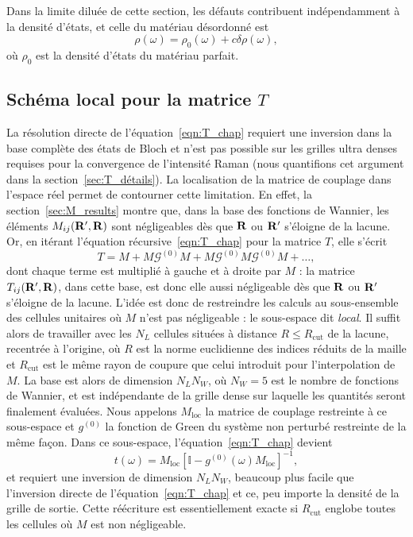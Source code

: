Dans la limite diluée de cette section, les défauts contribuent indépendamment à la densité d'états, et celle du matériau désordonné est
\begin{equation}
    \rho(\omega) = \rho_0(\omega) + c\delta\rho(\omega),
\end{equation}
où $\rho_0$ est la densité d'états du matériau parfait.

\subsection{Schéma local pour la matrice $T$}\label{sec:T_local}

La résolution directe de l'équation~\eqref{eqn:T_chap} requiert une inversion dans la base complète des états de Bloch et n'est pas possible sur les grilles ultra denses requises pour la convergence de l'intensité Raman (nous quantifions cet argument dans la section~\ref{sec:T_détails}). La localisation de la matrice de couplage dans l'espace réel permet de contourner cette limitation. En effet, la section~\ref{sec:M_results} montre que, dans la base des fonctions de Wannier, les éléments $M_{ij}(\mathbf{R}',\mathbf{R})$ sont négligeables dès que $\mathbf{R}$ ou $\mathbf{R}'$ s'éloigne de la lacune. Or, en itérant l'équation récursive~\eqref{eqn:T_chap} pour la matrice $T$, elle s'écrit
\begin{equation}
    T = M+ M\mathcal{G}^{(0)}M+M\mathcal{G}^{(0)}M\mathcal{G}^{(0)}M+\dots,
\end{equation}
dont chaque terme est multiplié à gauche et à droite par $M$ : la matrice $T_{ij}(\mathbf{R}',\mathbf{R})$, dans cette base, est donc elle aussi négligeable dès que $\mathbf{R}$ ou $\mathbf{R}'$ s'éloigne de la lacune. L'idée est donc de restreindre les calculs au sous-ensemble des cellules unitaires où $M$ n'est pas négligeable : le sous-espace dit \textit{local}. Il suffit alors de travailler avec les $N_L$ cellules situées à distance $R\le R_\text{cut}$ de la lacune, recentrée à l'origine, où $R$ est la norme euclidienne des indices réduits de la maille et $R_\text{cut}$ est le même rayon de coupure que celui introduit pour l'interpolation de $M$. La base est alors de dimension $N_LN_W$, où $N_W=5$ est le nombre de fonctions de Wannier, et est indépendante de la grille dense sur laquelle les quantités seront finalement évaluées. Nous appelons $M_\text{loc}$ la matrice de couplage restreinte à ce sous-espace et $g^{(0)}$ la fonction de Green du système non perturbé restreinte de la même façon. Dans ce sous-espace, l'équation~\eqref{eqn:T_chap} devient
\begin{equation}
    t(\omega) = M_\text{loc}\left[\mathbb{I}-g^{(0)}(\omega)M_\text{loc}\right]^{-1},\label{eqn:t_loc}
\end{equation}
et requiert une inversion de dimension $N_LN_W$, beaucoup plus facile que l'inversion directe de l'équation~\eqref{eqn:T_chap} et ce, peu importe la densité de la grille de sortie. Cette réécriture est essentiellement exacte si $R_\text{cut}$ englobe toutes les cellules où $M$ est non négligeable.

